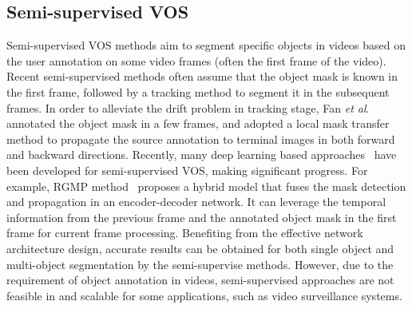 \documentclass[journal]{IEEEtran}
\newcommand{\etal}{\textit{et al}. }
\begin{document}
\subsection{Semi-supervised VOS}
Semi-supervised VOS methods aim to segment specific objects in videos based on the user annotation on some video frames (often the first frame of the video). Recent semi-supervised methods \cite{CVPR2017_Caelles,CVPR2016_Tsai,CVPR2015_Wen,BMVC2017_Voigtlaender,CVPR2018_Cheng} often assume that the object mask is known in the first frame, followed by a tracking method to segment it in the subsequent frames.
In order to alleviate the drift problem \cite{TIP2018_Liu} in tracking stage, Fan \etal \cite{SIGGRAPH2015_Fan} annotated the object mask in a few frames, 
and adopted a local mask transfer method to propagate the source annotation to terminal images in both forward and backward directions.
Recently, many deep learning based approaches~\cite{CVPR2017_Khoreva,CVPR2017_Caelles,arxiv2017_Khoreva,CVPR2018_Cheng,BMVC2017_Voigtlaender,CVPR2018_Oh} have been developed for semi-supervised VOS, making significant progress. For example, RGMP method~\cite{CVPR2018_Oh} proposes a hybrid model that fuses the mask detection and propagation in an encoder-decoder network. It can leverage the temporal information from the previous frame and the annotated object mask in the first frame for current frame processing. Benefiting from the effective network architecture design, accurate results can be obtained for both single object and multi-object segmentation by the semi-supervise methods. However, due to the requirement of object annotation in videos, semi-supervised approaches are not feasible in and scalable for some applications, such as video surveillance systems. 
\end{document}
